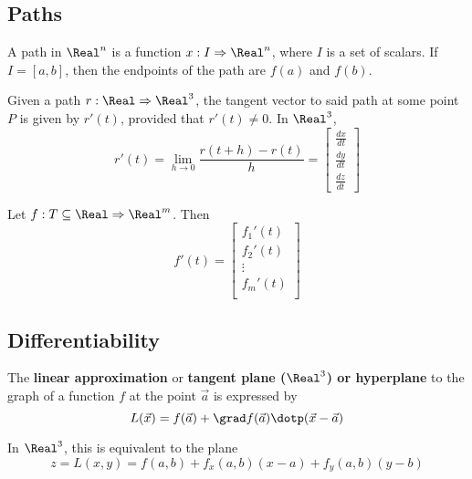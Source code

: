 \subsection{Paths}


\begin{definition}[Path]
  A path in $\Real^n$ is a function $x : I \Rightarrow \Real^n$, where $I$ is a set of scalars. If $I = [a, b]$, then the endpoints of the path are $f(a)$ and $f(b)$.
\end{definition}

\begin{definition}
  Given a path $r : \Real \Rightarrow \Real^3$, the tangent vector to said path at some point $P$ is given by $r'(t)$, provided that $r'(t) \neq 0$. In $\Real^3$,
  \[
    r'(t) = \lim_{h \to 0} \frac{r(t + h) - r(t)}{h} = \begin{bmatrix}
      \frac{dx}{dt} \\
      \frac{dy}{dt} \\
      \frac{dz}{dt}
    \end{bmatrix}
  \]
\end{definition}

\begin{definition}
  Let $f : T \subseteq \Real \Rightarrow \Real^m$. Then
  \[
    f'(t) = \begin{bmatrix}
      f_1'(t) \\
      f_2'(t) \\
      \vdots \\
      f_m'(t) \\
    \end{bmatrix}
  \]
\end{definition}

\subsection{Differentiability}


\begin{definition}
  The \textbf{linear approximation} or \textbf{tangent plane ($\Real^3$) or hyperplane} to the graph of a function $f$ at the point $\vec{a}$ is expressed by
  \[
    L(\vec{x}) = f(\vec{a}) + \grad f(\vec{a}) \dotp (\vec{x} - \vec{a})
  \]

  In $\Real^3$, this is equivalent to the plane
  \[
    z = L(x, y) = f(a, b) + f_x(a, b) (x - a) + f_y(a, b) (y - b)
  \]
\end{definition}

